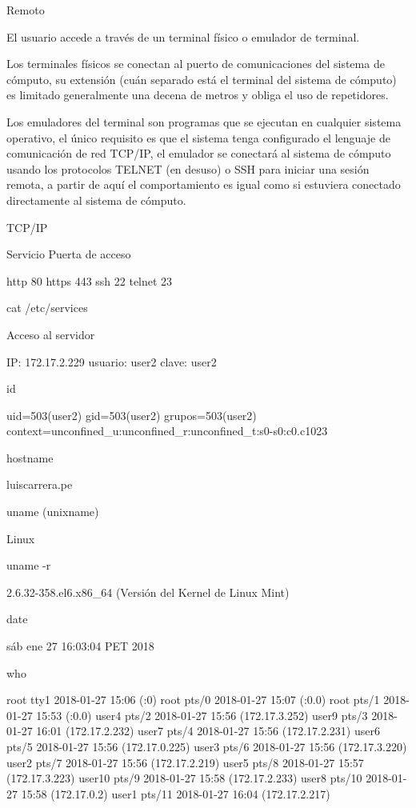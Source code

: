 \documentclass{memoir}
\begin{document}
Remoto

El usuario accede a través de un terminal físico o emulador de terminal.

Los terminales físicos se conectan al puerto de comunicaciones del sistema de cómputo, su extensión (cuán separado está el terminal del sistema de cómputo) es limitado generalmente una decena de metros y obliga el uso de repetidores.

Los emuladores del terminal son programas que se ejecutan en cualquier sistema operativo, el único requisito es que el sistema tenga configurado el lenguaje de comunicación de red TCP/IP, el emulador se conectará al sistema de cómputo usando los protocolos TELNET (en desuso) o SSH para iniciar una sesión remota, a partir de aquí el comportamiento es igual como si estuviera conectado directamente al sistema de cómputo.

TCP/IP

Servicio Puerta de acceso

http 80
https 443
ssh 22
telnet 23

cat /etc/services

Acceso al servidor

IP: 172.17.2.229
usuario: user2
clave: user2

id

uid=503(user2) gid=503(user2) grupos=503(user2) context=unconfined_u:unconfined_r:unconfined_t:s0-s0:c0.c1023

hostname

luiscarrera.pe

uname (unixname)

Linux

uname -r

2.6.32-358.el6.x86_64 (Versión del Kernel de Linux Mint)

date

sáb ene 27 16:03:04 PET 2018

who

root     tty1         2018-01-27 15:06 (:0)
root     pts/0        2018-01-27 15:07 (:0.0)
root     pts/1        2018-01-27 15:53 (:0.0)
user4    pts/2        2018-01-27 15:56 (172.17.3.252)
user9    pts/3        2018-01-27 16:01 (172.17.2.232)
user7    pts/4        2018-01-27 15:56 (172.17.2.231)
user6    pts/5        2018-01-27 15:56 (172.17.0.225)
user3    pts/6        2018-01-27 15:56 (172.17.3.220)
user2    pts/7        2018-01-27 15:56 (172.17.2.219)
user5    pts/8        2018-01-27 15:57 (172.17.3.223)
user10   pts/9        2018-01-27 15:58 (172.17.2.233)
user8    pts/10       2018-01-27 15:58 (172.17.0.2)
user1    pts/11       2018-01-27 16:04 (172.17.2.217)
\end{document}
